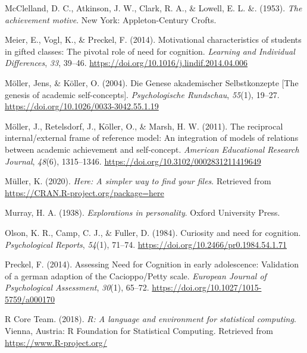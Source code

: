 \documentclass[
  man]{apa6}
\newlength{\cslhangindent}
\newlength{\cslentryspacingunit} %
\newenvironment{CSLReferences}[2] %
 {%
  \setlength{\parindent}{0pt}
  \ifodd #1
  \let\oldpar\par
  \def\par{\hangindent=\cslhangindent\oldpar}
  \fi
  \setlength{\parskip}{#2\cslentryspacingunit}
 }%
 {}
\begin{document}
\begin{CSLReferences}{1}{0}
\leavevmode{}%
McClelland, D. C., Atkinson, J. W., Clark, R. A., \& Lowell, E. L. \&. (1953). \emph{The achievement motive}. New York: Appleton-Century Crofts.

\leavevmode{}%
Meier, E., Vogl, K., \& Preckel, F. (2014). Motivational characteristics of students in gifted classes: The pivotal role of need for cognition. \emph{Learning and Individual Differences}, \emph{33}, 39--46. \url{https://doi.org/10.1016/j.lindif.2014.04.006}

\leavevmode{}%
Möller, Jens, \& Köller, O. (2004). {Die Genese akademischer Selbstkonzepte {[}The genesis of academic self-concepts{]}}. \emph{Psychologische Rundschau}, \emph{55}(1), 19--27. \url{https://doi.org/10.1026/0033-3042.55.1.19}

\leavevmode{}%
Möller, J., Retelsdorf, J., Köller, O., \& Marsh, H. W. (2011). The reciprocal internal/external frame of reference model: An integration of models of relations between academic achievement and self-concept. \emph{American Educational Research Journal}, \emph{48}(6), 1315--1346. \url{https://doi.org/10.3102/0002831211419649}

\leavevmode{}%
Müller, K. (2020). \emph{Here: A simpler way to find your files}. Retrieved from \url{https://CRAN.R-project.org/package=here}

\leavevmode{}%
Murray, H. A. (1938). \emph{Explorations in personality}. Oxford University Press.

\leavevmode{}%
Olson, K. R., Camp, C. J., \& Fuller, D. (1984). Curiosity and need for cognition. \emph{Psychological Reports}, \emph{54}(1), 71--74. \url{https://doi.org/10.2466/pr0.1984.54.1.71}

\leavevmode{}%
Preckel, F. (2014). Assessing {Need} for {Cognition} in early adolescence: Validation of a german adaption of the {Cacioppo}/{Petty} scale. \emph{European Journal of Psychological Assessment}, \emph{30}(1), 65--72. \url{https://doi.org/10.1027/1015-5759/a000170}

\leavevmode{}%
R Core Team. (2018). \emph{R: A language and environment for statistical computing}. Vienna, Austria: R Foundation for Statistical Computing. Retrieved from \url{https://www.R-project.org/}


\end{CSLReferences}
\end{document}
